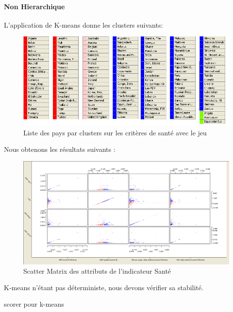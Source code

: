 \paragraph{Non Hierarchique}
L'application de K-means donne les clusters suivants: 

\begin{figure}[H]
	\begin{center}
		\includegraphics[scale=0.5]{Image/TableViewPolitiqueKmeansNomissing2}
		\caption{Liste des pays par clusters sur les critères de santé avec le jeu \jeuc}
	\end{center}
\end{figure}


Nous obtenons les résultats suivants : 

\begin{figure}[H]
	\begin{center}
		\includegraphics[scale=0.5]{Image/scattermatrixPolitiquekmeansNoMissing2}
		\caption{Scatter Matrix des attributs de l'indicateur Santé \jeuc}
	\end{center}
\end{figure}

K-means n'étant pas déterministe, nous devons vérifier sa stabilité.

\begin{Huge}


scorer pour k-means 
\end{Huge} 


